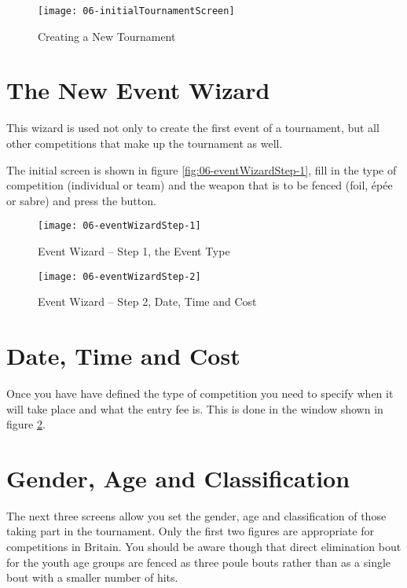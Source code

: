 \documentclass[a4paper,11pt]{memoir}
\begin{document}
\begin{figure}
 \centering
 \texttt{[image: 06-initialTournamentScreen]}
 \caption{Creating a New Tournament} \label{fig:06-initialTournamentScreen}
\end{figure}

\section{The New Event Wizard}

This wizard is used not only to create the first event of a tournament, but all other competitions that make up the tournament as well.

The initial screen is shown in figure \ref{fig:06-eventWizardStep-1}, fill in the type of competition (individual or team) and the weapon that is to be fenced (foil, épée or sabre) and press the  button.

\begin{figure}[!ht]
 \centering
 \begin{minipage}{0.4\textwidth}
  \centering
  \texttt{[image: 06-eventWizardStep-1]}
  \caption{Event Wizard -- Step 1, the Event Type} \label{fig:06-eventWizardStep-1}
\end{minipage}
\hfill
 \begin{minipage}{0.4\textwidth}
  \centering
  \texttt{[image: 06-eventWizardStep-2]}
  \caption{Event Wizard -- Step 2, Date, Time and Cost} \label{fig:06-eventWizardStep-2}
\end{minipage}
\end{figure}

\section{Date, Time and Cost}

Once you have have defined the type of competition you need to specify when it will take place and what the entry fee is. This is done in the window shown in figure \ref{fig:06-eventWizardStep-2}.

\section{Gender, Age and Classification}

The next three screens allow you set the gender, age and classification of those taking part in the tournament. Only the first two figures are appropriate for competitions in Britain. You should be aware though that direct elimination bout for the youth age groups are fenced as three poule bouts rather than as a single \gls{bout} with a smaller number of hits. 
\end{document}
